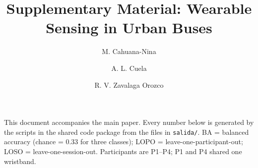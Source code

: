 \documentclass[runningheads]{llncs}
\begin{document}
\title{Supplementary Material: Wearable Sensing in Urban Buses}
\author{M. Cahuana-Nina \and A. L. Cuela \and R. V. Zavalaga Orozco}
\renewcommand\thesection{S\arabic{section}}\renewcommand\thetable{S\arabic{table}}\renewcommand\thefigure{S\arabic{figure}}
\maketitle
\noindent This document accompanies the main paper. Every number below is generated by the scripts in the shared code package from the files in \texttt{salida/}. BA = balanced accuracy (chance = 0.33 for three classes); LOPO = leave-one-participant-out; LOSO = leave-one-session-out. Participants are P1--P4; P1 and P4 shared one wristband.
\end{document}
